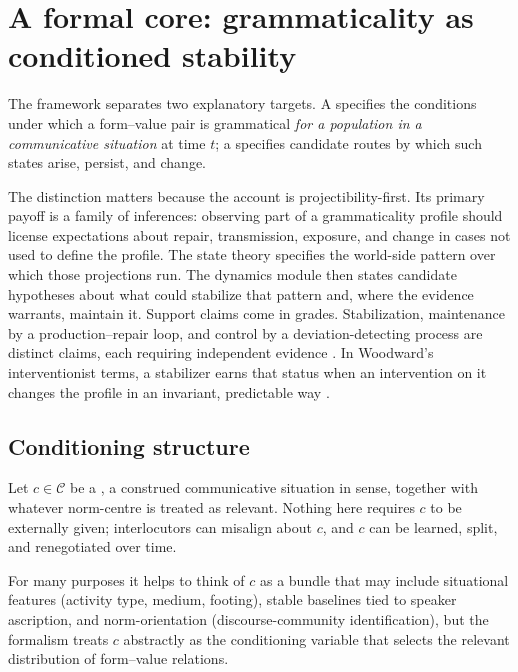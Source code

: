 \section{A formal core: grammaticality as conditioned stability}
\label{sec:formalism}

The framework separates two explanatory targets. A  specifies
the conditions under which a form--value pair is grammatical \emph{for a
population in a communicative situation} at time $t$; a 
specifies candidate routes by which such states arise, persist, and change.

The distinction matters because the account is projectibility-first. Its
primary payoff is a family of inferences: observing part of a grammaticality
profile should license expectations about repair, transmission, exposure, and
change in cases not used to define the profile. The state theory specifies the
world-side pattern over which those projections run. The dynamics module then
states candidate  hypotheses about what could stabilize that
pattern and, where the evidence warrants, maintain it. Support claims come in
grades.
Stabilization, maintenance by a production--repair loop, and control by a
deviation-detecting process are distinct claims, each requiring independent
evidence \autocite{reynolds2026kindsProjectibilityProfiles,
reynolds2026notEveryStableCluster}.
In Woodward's interventionist terms, a stabilizer earns that status when an intervention on it changes the profile in an invariant, predictable way \autocite{woodward2003MakingThingsHappen, woodward2001}.

\subsection{Conditioning structure}
\label{sec:conditioning}

Let $c\in\mathcal{C}$ be a , a construed communicative situation in  sense, together with whatever norm-centre is treated as relevant. Nothing here requires $c$ to be externally given; interlocutors can misalign about $c$, and $c$ can be learned, split, and renegotiated over time.

For many purposes it helps to think of $c$ as a bundle that may include situational features (activity type, medium, footing), stable baselines tied to speaker ascription, and norm-orientation (discourse-community identification), but the formalism treats $c$ abstractly as the conditioning variable that selects the relevant distribution of form--value relations.

